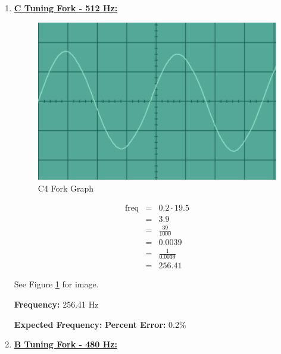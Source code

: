 \documentclass[12pt,oneside]{article}
\begin{document}
\begin{enumerate}
\item \underline{\bf C Tuning Fork - 512 Hz:}

\color{red}

\begin{figure}[H]

{\centering \includegraphics[width=15cm,]{./images/c4} 

}

\caption{C4 Fork Graph}\label{fig:c4}
\end{figure}

\begin{eqnarray}
\text{freq} & = & 0.2 \cdot 19.5 \\
            & = & 3.9 \\
            & = & \frac{39}{1000} \\
            & = & 0.0039 \\
            & = & \frac{1}{0.0039} \\
            & = & 256.41
\end{eqnarray}

See Figure \ref{fig:c4} for image.

\textbf{Frequency:} 256.41 Hz

\par

\textbf{Expected Frequency:} \textbf{Percent Error: } 0.2\%

\color{black}

\item \underline{\bf B Tuning Fork - 480 Hz:}
\color{red}

\begin{figure}[H]


\end{figure}
\end{enumerate}
\end{document}
